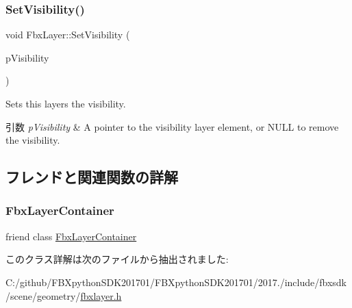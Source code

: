 \subsubsection{\texorpdfstring{Set\+Visibility()}{SetVisibility()}}
{\footnotesize\ttfamily void Fbx\+Layer\+::\+Set\+Visibility (\begin{DoxyParamCaption}\item[{\hyperlink{class_fbx_layer_element_visibility}{Fbx\+Layer\+Element\+Visibility} $\ast$}]{p\+Visibility }\end{DoxyParamCaption})}

Sets this layer\textquotesingle{}s the visibility. 
\begin{DoxyParams}{引数}
{\em p\+Visibility} & A pointer to the visibility layer element, or {\ttfamily N\+U\+LL} to remove the visibility. \\
\hline
\end{DoxyParams}


\subsection{フレンドと関連関数の詳解}
\mbox{\label{class_fbx_layer_a791d2046ce60bf6f5fb85d9dc6242f2e}} 
\subsubsection{\texorpdfstring{Fbx\+Layer\+Container}{FbxLayerContainer}}
{\footnotesize\ttfamily friend class \hyperlink{class_fbx_layer_container}{Fbx\+Layer\+Container}\hspace{0.3cm}{\ttfamily [friend]}}



このクラス詳解は次のファイルから抽出されました\+:\begin{DoxyCompactItemize}
\item 
C\+:/github/\+F\+B\+Xpython\+S\+D\+K201701/\+F\+B\+Xpython\+S\+D\+K201701/2017./include/fbxsdk/scene/geometry/\hyperlink{fbxlayer_8h}{fbxlayer.\+h}\end{DoxyCompactItemize}

